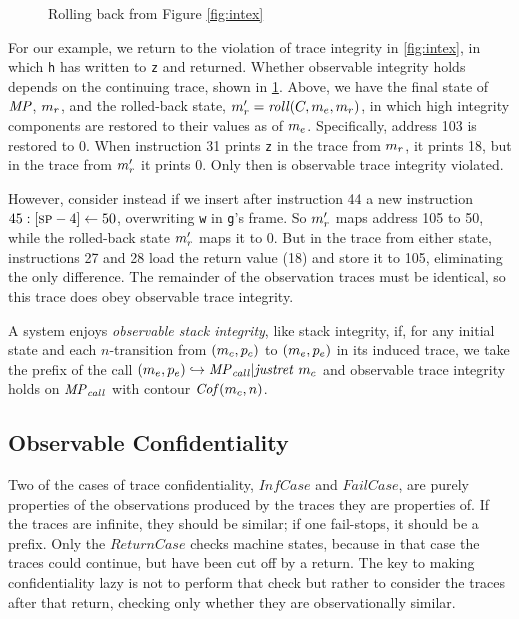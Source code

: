 \documentclass[acmsmall,review,anonymous]{acmart}\settopmatter{printfolios=true,printccs=false,printacmref=false}
\begin{document}
{    \begin{figure}
      \integritylazyexample
      \caption{Rolling back from Figure \ref{fig:intex}}
      \label{fig:intlex}
    \end{figure}

    For our example, we return to the violation of trace integrity in
    \cref{fig:intex}, in which {\tt h} has written to {\tt z} and returned.
    Whether observable integrity holds depends on the continuing trace, shown
    in \cref{fig:intlex}. Above, we have the final state of \(\mathit{MP}\),
    \(m_r\), and the rolled-back state, \(m_r' =
    \mathit{roll}(C,m_e,m_r)\), in which high integrity
    components are restored to their values as of \(m_e\). Specifically,
    address 103 is restored to 0. When instruction 31 prints {\tt z} in the
    trace from \(m_r\), it prints 18, but in the trace from \(m_r'\)
    it prints 0. Only then is observable trace integrity violated.

    However, consider instead if we insert after instruction 44 a new
    instruction \(45: [\textsc{sp}-4] \leftarrow 50\), overwriting {\tt w} in
    {\tt g}'s frame. So \(m_r'\) maps address 105 to 50, while the
    rolled-back state \(m_r'\) maps it to 0. But in the trace from either
    state, instructions 27 and 28 load the return value (18) and store it to
    105, eliminating the only difference. The remainder of the observation
    traces must be identical, so this trace does obey observable trace
    integrity.


      A system enjoys {\em observable stack integrity}, like stack integrity,
      if, for any initial state and each \(n\)-transition from
      \((m_c,p_c)\) to \((m_e,p_e)\) in its
      induced trace, we take the prefix of the call
      \((m_e,p_e) \hookrightarrow \mathit{MP}_{\mathit{call}} | \mathit{justret}\ m_c\)
      and observable trace integrity holds on \(\mathit{MP}_{\mathit{call}}\) with
      contour \(\mathit{Cof}(m_c,n)\).

  \subsection{Observable Confidentiality}

      Two of the cases of trace confidentiality, \(\mathit{InfCase}\)
      and \(\mathit{FailCase}\), are purely properties of the
      observations produced by the traces they are properties of. If
      the traces are infinite, they should be similar; if one
      fail-stops, it should be a prefix. Only the
      \(\mathit{ReturnCase}\) checks machine states, because in that
      case the traces could continue, but have been cut off by a
      return. The key to making confidentiality lazy is not to perform that
      check but rather to consider the traces after that return,
      checking only whether they are observationally similar.

}
\end{document}
